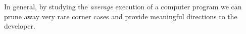 In general, by studying the \emph{average} execution of a computer program we can prune away very rare corner cases and provide meaningful directions to the developer.
%
\newpage



%
%
%

%
%
